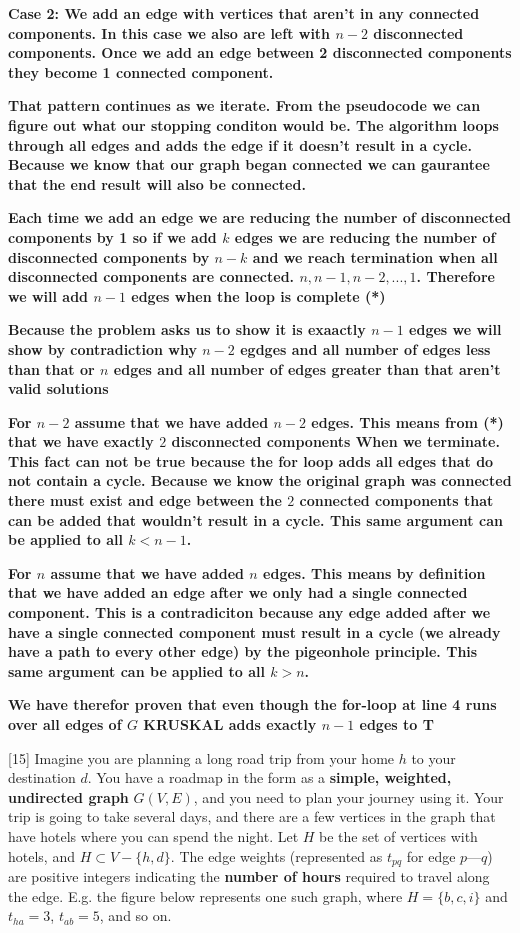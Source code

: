 \documentclass[addpoints]{exam}
\def\mysolution#1{}    %
\begin{document}
\begin{questions}
\textbf{Case 2: We add an edge with vertices that aren't in any connected components. In this case we also are left with $n-2$ disconnected components. Once we add an edge between 2 disconnected components they become 1 connected component.}

\textbf{That pattern continues as we iterate. From the pseudocode we can figure out what our stopping conditon would be. The algorithm loops through all edges and adds the edge if it doesn't result in a cycle. Because we know that our graph began connected we can gaurantee that the end result will also be connected.}

\textbf{Each time we add an edge we are reducing the number of disconnected components by 1 so if we add $k$ edges we are reducing the number of disconnected components by $n-k$ and we reach termination when all disconnected components are connected. $n,n-1,n-2,...,1$. Therefore we will add $n-1$ edges when the loop is complete (*)}

\textbf{Because the problem asks us to show it is exaactly $n-1$ edges we will show by contradiction why $n-2$ egdges and all number of edges less than that or $n$ edges and all number of edges greater than that aren't valid solutions}

\textbf{For $n-2$ assume that we have added $n-2$ edges. This means from (*) that we have exactly $2$ disconnected components When we terminate. This fact can not be true because the for loop adds all edges that do not contain a cycle. Because we know the original graph was connected there must exist and edge between the $2$ connected components that can be added that wouldn't result in a cycle. This same argument can be applied to all $k < n-1$.} 

\textbf{For $n$ assume that we have added $n$ edges. This means by definition that we have added an edge after we only had a single connected component. This is a contradiciton because any edge added after we have a single connected component must result in a cycle (we already have a path to every other edge) by the pigeonhole principle. This same argument can be applied to all $k > n$.}

\textbf{We have therefor proven that even though the for-loop at line 4 runs over all edges of $G$ KRUSKAL adds exactly $n-1$ edges to T}

\mysolution{

}

[15]
Imagine you are planning a long road trip from your home $h$ to your destination $d$. You have a roadmap in the form as a \textbf{simple, weighted, undirected graph} $G(V,E)$, and you need to plan your journey using it. Your trip is going to take several days, and there are a few vertices in the graph that have hotels where you can spend the night. Let $H$ be the set of vertices with hotels, and $H \subset V-\{h,d\}$. The edge weights (represented as $t_{pq}$ for edge $p$---$q$) are positive integers indicating the \textbf{number of hours} required to travel along the edge. E.g. the figure below represents one such graph, where $H=\{b,c,i\}$ and $t_{ha}=3$, $t_{ab}=5$, and so on.


\end{questions}
\end{document}
